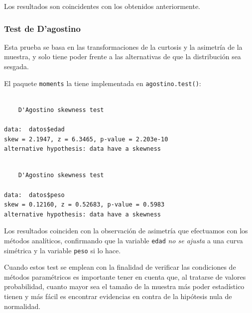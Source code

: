 \documentclass[
  spanish,
  a4paper,
]{scrbook}
\newenvironment{Shaded}{\begin{snugshade}}{\end{snugshade}}
\newcommand{\FunctionTok}[1]{\textcolor[rgb]{0.28,0.35,0.67}{#1}}
\newcommand{\NormalTok}[1]{\textcolor[rgb]{0.00,0.23,0.31}{#1}}
\newcommand{\SpecialCharTok}[1]{\textcolor[rgb]{0.37,0.37,0.37}{#1}}
\begin{document}
Los resultados son coincidentes con los obtenidos anteriormente.

\subsubsection{Test de D'agostino}\label{test-de-dagostino}

Esta prueba se basa en las transformaciones de la curtosis y la
asimetría de la muestra, y solo tiene poder frente a las alternativas de
que la distribución sea sesgada.

El paquete \texttt{moments} la tiene implementada en
\texttt{agostino.test()}:

\begin{Shaded}
\end{Shaded}

\begin{verbatim}

    D'Agostino skewness test

data:  datos$edad
skew = 2.1947, z = 6.3465, p-value = 2.203e-10
alternative hypothesis: data have a skewness
\end{verbatim}

\begin{Shaded}
\end{Shaded}

\begin{verbatim}

    D'Agostino skewness test

data:  datos$peso
skew = 0.12160, z = 0.52683, p-value = 0.5983
alternative hypothesis: data have a skewness
\end{verbatim}

Los resultados coinciden con la observación de asimetría que efectuamos
con los métodos analíticos, confirmando que la variable \texttt{edad}
\emph{no se ajusta} a una curva simétrica y la variable \texttt{peso} si
lo hace.

Cuando estos test se emplean con la finalidad de verificar las
condiciones de métodos paramétricos es importante tener en cuenta que,
al tratarse de valores probabilidad, cuanto mayor sea el tamaño de la
muestra más poder estadístico tienen y más fácil es encontrar evidencias
en contra de la hipótesis nula de normalidad.
\end{document}

